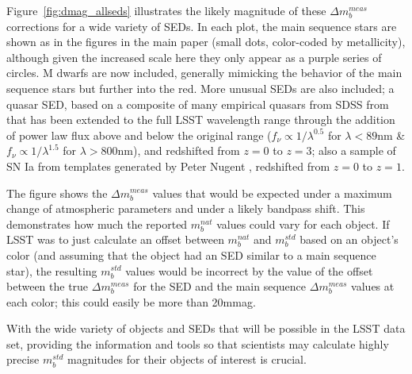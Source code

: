 \documentclass[12pt,preprint]{aastex}
\begin{document}
Figure~\ref{fig:dmag_allseds} illustrates the likely magnitude of
these $\Delta m_b^{meas}$ corrections for a wide variety of SEDs. In each plot, the main
sequence stars are shown as in the figures in the main paper (small
dots, color-coded by metallicity), although given the increased scale
here they only appear as a purple series of circles. M dwarfs are now
included, generally mimicking the behavior of the main sequence stars but
further into the red. More unusual SEDs are also
included; a quasar SED, based on a composite of many empirical quasars
from SDSS from \citet{VandenBerk2001} that has been extended to the
full LSST wavelength range through the addition of power law flux
above and below the original range ($f_\nu \propto 1/\lambda^{0.5}$
for $\lambda<89$nm \& $f_\nu \propto 1/\lambda^{1.5}$ for
$\lambda>800$nm), and redshifted from $z=0$ to $z=3$; also a sample of
SN Ia from templates generated by Peter Nugent \citep{Nugent2002}, redshifted
from $z=0$ to $z=1$.  

The figure shows the $\Delta m_b^{meas}$ values that would be expected
under a maximum change of atmospheric parameters and under a likely
bandpass shift. This demonstrates how much the reported $m_b^{nat}$
values could vary for each object. If LSST was to just calculate an
offset between $m_b^{nat}$ and $m_b^{std}$ based on an object's color
(and assuming that the object had an SED similar to a main sequence
star), the resulting $m_b^{std}$ values would be incorrect by the
value of the offset between the true $\Delta m_b^{meas}$ for the SED
and the main sequence $\Delta m_b^{meas}$ values at each color; this
could easily be more than 20mmag.  

With the wide variety of objects and SEDs that will be possible in the
LSST data set, providing the information and tools so that
scientists may calculate highly precise $m_b^{std}$ magnitudes for
their objects of interest is crucial. 
\end{document}

